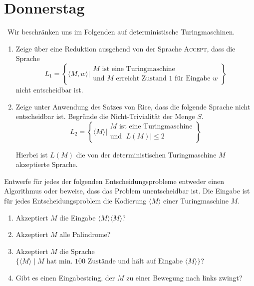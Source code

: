 \documentclass{uebung_cs}
\begin{document}
\section*{Donnerstag}

\begin{exercise}[Entscheidbarkeit II][\href{https://moodle.studiumdigitale.uni-frankfurt.de/moodle/mod/assign/view.php?id=245311}{Moodle}\athome\medium]\
	Wir beschränken uns im Folgenden auf deterministische Turingmaschinen.
	\begin{enumerate}
		\item Zeige über eine Reduktion ausgehend von der Sprache \textsc{Accept}, dass die Sprache $$L_1 = \left\{\langle M,w\rangle \mathrel{\Bigg|} \begin{array}{l}M\text{ ist eine Turingmaschine}\\\text{und }M\text{ erreicht Zustand 1 für Eingabe }w\end{array}\right\}$$ nicht entscheidbar ist.
		
		\item Zeige unter Anwendung des Satzes von Rice, dass die folgende Sprache nicht entscheidbar ist. Begründe die Nicht-Trivialität der Menge $S$.
 $$L_2 = \left\{\langle M\rangle \mathrel{\Bigg|} \begin{array}{l}M\text{ ist eine Turingmaschine}\\\text{und } |L(M)| \leq 2\end{array}\right\}$$
			
		Hierbei ist $L(M)$ die von der deterministischen Turingmaschine $M$ akzeptierte Sprache.
	\end{enumerate}
\end{exercise}

\begin{exercise}
	Entwerfe für jedes der folgenden Entscheidungsprobleme entweder einen Algorithmus oder beweise, dass das Problem unentscheidbar ist. Die Eingabe ist für jedes Entscheidungsproblem die Kodierung $\langle M \rangle$ einer Turingmaschine $M$.
	\begin{enumerate}
		\item Akzeptiert $M$ die Eingabe $\langle M \rangle \langle M \rangle$?
		\item Akzeptiert $M$ alle Palindrome?
		\item Akzeptiert $M$ die Sprache $\{\langle M \rangle \;|\; M \text{ hat min. 100 Zustände und hält auf Eingabe } \langle M \rangle\}$?
		\item Gibt es einen Eingabestring, der $M$ zu einer Bewegung nach links zwingt?
	\end{enumerate}
\end{exercise}
\end{document}
